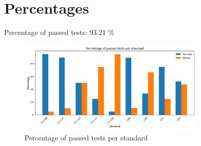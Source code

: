 \documentclass{article}
\begin{document}
\section{Percentages}Percentage of passed tests:
93.21 \%\begin{figure}[h!]
\centering
\includegraphics[width=0.8\textwidth]{../reports/clava/images/global_percentage.png}
\caption{Percentage of passed tests per standard}
\label{fig:global_percentage}
\end{figure}
\end{document}
